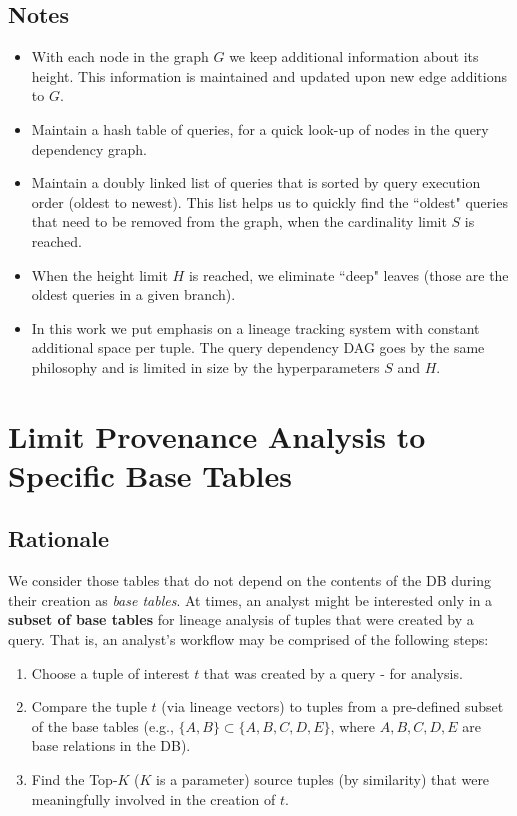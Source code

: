 \subsection{Notes} 
\begin{itemize}
    \item With each node in the graph $G$ we keep additional information about its height. This information is maintained and updated upon new edge additions to $G$.
    \item Maintain a hash table of queries, for a quick look-up of nodes in the query dependency graph.
    \item Maintain a doubly linked list of queries that is sorted by query execution order (oldest to newest). This list helps us to quickly find the ``oldest" queries that need to be removed from the graph, when the cardinality limit $S$ is reached.
    \item When the height limit $H$ is reached, we eliminate ``deep" leaves (those are the oldest queries in a given branch).
    \item In this work we put emphasis on a lineage tracking system with constant additional space per tuple. The query dependency DAG goes by the same philosophy and is limited in size by the hyperparameters $S$ and $H$.
\end{itemize}


\section{Limit Provenance Analysis to Specific Base Tables}

\subsection{Rationale}
We consider those tables that do not depend on the contents of the DB during their creation as \textit{base tables}.
At times, an analyst might be interested only in a \textbf{subset of base tables} for lineage analysis of tuples that were created by a query. That is, an analyst's workflow may be comprised of the following steps:
\begin{enumerate}
    \item Choose a tuple of interest $t$ that was created by a query - for analysis.
    \item Compare the tuple $t$ (via lineage vectors) to tuples from a pre-defined subset of the base tables (e.g., $\{{A, B}\} \subset \{{A,B,C,D,E}\}$, where $A,B,C,D,E$ are base relations in the DB).
    \item Find the Top-$K$ ($K$ is a parameter) source tuples (by similarity) that were meaningfully involved in the creation of $t$. 
\end{enumerate}

